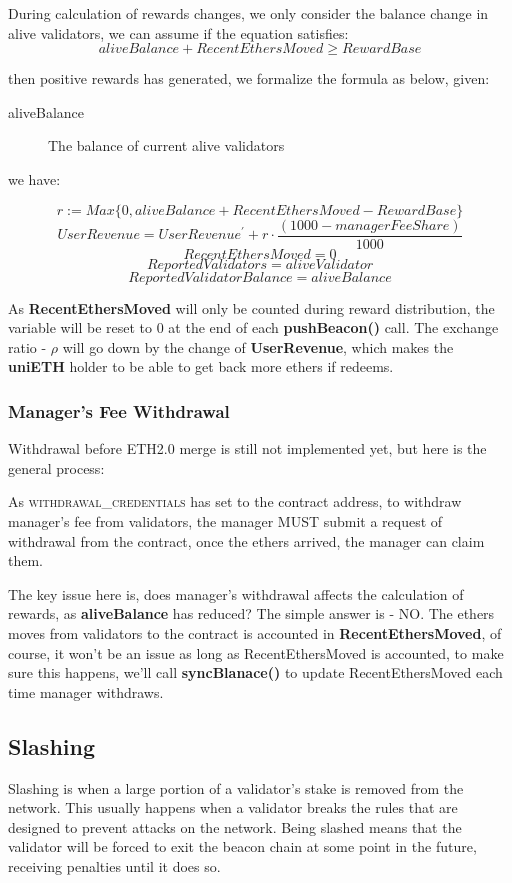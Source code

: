 \documentclass{article}
\begin{document}
During calculation of rewards changes, we only consider the balance change in alive validators, we can assume if the equation satisfies:
\[aliveBalance + RecentEthersMoved \geq RewardBase\]

then positive rewards has generated, we formalize the formula as below, given:

\begin{description}
\item[aliveBalance] The balance of current alive validators
\end{description}
we have:

\begin{theorem}
\label{calcReward}
\[r := Max\{0, aliveBalance + RecentEthersMoved - RewardBase\}\]
\[UserRevenue = UserRevenue^{\prime} + r \cdot \frac{(1000 - managerFeeShare)}{1000}\]
\[RecentEthersMoved = 0\]
\[ReportedValidators = aliveValidator\]
\[ReportedValidatorBalance = aliveBalance\]
\end{theorem}

As \textbf{RecentEthersMoved} will only be counted during reward distribution, the variable will be reset to 0 at the end of each \textbf{pushBeacon()} call. The exchange ratio - $\rho$ will go down by the change of \textbf{UserRevenue}, which makes the \textbf{uniETH} holder to be able to get back more ethers if redeems.

\subsubsection{Manager's Fee Withdrawal}
Withdrawal before ETH2.0 merge is still not implemented yet, but here is the general process: 

As \textsc{withdrawal\_credentials} has set to the contract address, to withdraw manager's fee from validators, the manager MUST submit a request of withdrawal from the contract, once the ethers arrived, the manager can claim them. 

The key issue here is, does manager's withdrawal affects the calculation of rewards, as \textbf{aliveBalance} has reduced? The simple answer is - NO. The ethers moves from validators to the contract is accounted in \textbf{RecentEthersMoved}, of course, it won't be an issue as long as RecentEthersMoved is accounted, to make sure this happens, we'll call \textbf{syncBlanace()} to update RecentEthersMoved  each time manager withdraws.

\subsection{Slashing}
Slashing is when a large portion of a validator's stake is removed from the network. This usually happens when a validator breaks the rules that are designed to prevent attacks on the network. Being slashed means that the validator will be forced to exit the beacon chain at some point in the future, receiving penalties until it does so.
\end{document}

